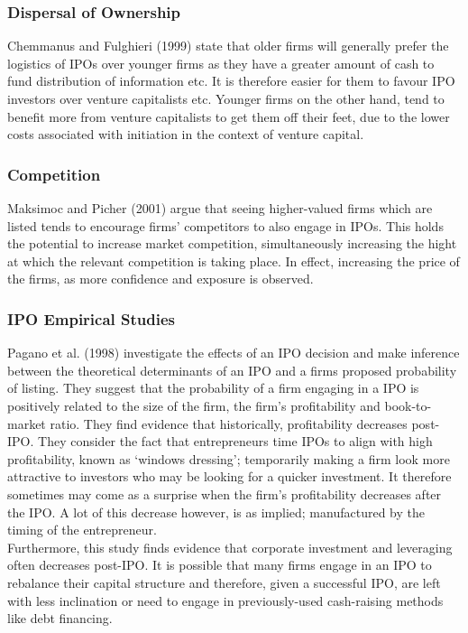 \documentclass[11pt, english]{article}
\begin{document}
		\subsubsection*{Dispersal of Ownership}

	Chemmanus and Fulghieri (1999) state that older firms will generally prefer the logistics of IPOs over younger firms as they have a greater amount of cash to fund distribution of information etc. It is therefore easier for them to favour IPO investors over venture capitalists etc. Younger firms on the other hand, tend to benefit more from venture capitalists to get them off their feet, due to the lower costs associated with initiation in the context of venture capital.

		\subsubsection*{Competition}

	Maksimoc and Picher (2001) argue that seeing higher-valued firms which are listed tends to encourage firms’ competitors to also engage in IPOs. This holds the potential to increase market competition, simultaneously increasing the hight at which the relevant competition is taking place. In effect, increasing the price of the firms, as more confidence and exposure is observed.

		\subsubsection*{IPO Empirical Studies}

	Pagano et al. (1998) investigate the effects of an IPO decision and make inference between the theoretical determinants of an IPO and a firms proposed probability of listing. They suggest that the probability of a firm engaging in a IPO is positively related to the size of the firm, the firm’s profitability and book-to-market ratio. They find evidence that historically, profitability decreases post-IPO. They consider the fact that entrepreneurs time IPOs to align with high profitability, known as ‘windows dressing’; temporarily making a firm look more attractive to investors who may be looking for a quicker investment. It therefore sometimes may come as a surprise when the firm’s profitability decreases after the IPO. A lot of this decrease however, is as implied; manufactured by the timing of the entrepreneur.\\

	Furthermore, this study finds evidence that corporate investment and leveraging often decreases post-IPO. It is possible that many firms engage in an IPO to rebalance their capital structure and therefore, given a successful IPO, are left with less inclination or need to engage in previously-used cash-raising methods like debt financing.\\
\end{document}
